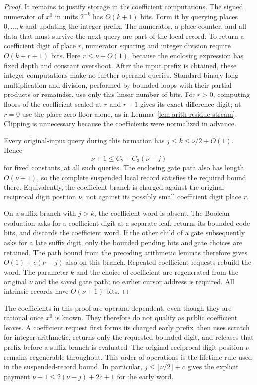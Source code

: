 \begin{proof}
It remains to justify storage in the coefficient computations.
The signed numerator of $x^0$ in units $2^{-k}$ has $O(k+1)$
bits.  Form it by querying places $0,\ldots,k$ and updating the
integer prefix.  The numerator, a place counter, and all data that
must survive the next query are part of the local record.
To return a coefficient digit of place $r$, numerator squaring and
integer division require $O(k+r+1)$ bits.  Here $r\leq \nu+O(1)$,
because the enclosing expression has fixed depth and constant
overshoot.  After the input prefix is obtained, these integer
computations make no further operand queries.  Standard binary
long multiplication and division, performed by bounded loops with
their partial products or remainder, use only this linear number
of bits.  For $r>0$, computing floors of the coefficient scaled at
$r$ and $r-1$ gives its exact difference digit; at $r=0$ use the
place-zero floor alone, as in Lemma~\ref{lem:arith-residue-stream}.
Clipping is unnecessary
because the coefficients were normalized in advance.

Every original-input query during this formation has
$j\leq k\leq \nu/2+O(1)$.  Hence
\begin{equation}
 \nu+1\leq C_2+C_3(\nu-j)
 \label{eq:arith-early-word-payment}
\end{equation}
for fixed constants, at all such queries.  The enclosing gate path
also has length $O(\nu+1)$, so the complete suspended local record
satisfies the required bound there.  Equivalently, the coefficient
branch is charged against the original reciprocal digit position $\nu$, not
against its possibly small coefficient digit place $r$.

On a suffix branch with $j>k$, the coefficient word is absent.
The Boolean evaluation asks for a coefficient digit at a separate
leaf, returns its bounded code bits, and discards the coefficient
word.  If the other child of a gate subsequently asks for a late
suffix digit, only the bounded pending bits and gate choices are
retained.  The path bound from the preceding arithmetic lemmas
therefore gives $O(1)+c(\nu-j)$ also on this branch.  Repeated
coefficient requests rebuild the word.  The parameter $k$ and the
choice of coefficient are regenerated from the original $\nu$ and
the saved gate path; no earlier cursor address is required.
All intrinsic records have $O(\nu+1)$ bits.
\end{proof}

The coefficients in this proof are operand-dependent, even though they
are rational once $x^0$ is known.  They therefore do not qualify as
public coefficient leaves.  A coefficient request first forms its
charged early prefix, then uses scratch for integer arithmetic, returns
only the requested bounded digit, and releases that prefix before a
suffix branch is evaluated.  The original reciprocal digit position $\nu$ remains
regenerable throughout.  This order of operations is the lifetime rule
used in the suspended-record bound.  In particular, $j\le\lfloor \nu/2\rfloor+c$
gives the explicit payment $\nu+1\le2(\nu-j)+2c+1$ for the early word.

